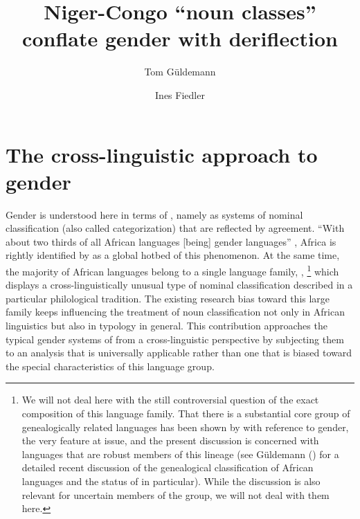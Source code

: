 \documentclass[output=collectionpaper]{langsci/langscibook}
\title{Niger-Congo ``noun classes'' conflate gender with deriflection}
\author{Tom Güldemann%
\affiliation{Humboldt University Berlin and Max Planck Institute for the Science of Human History}%
\and%
Ines Fiedler%
\affiliation{Humboldt University Berlin}
}%
\begin{document}
\section{The cross-linguistic approach to gender}
\label{sec:Gueld:1}

Gender is understood here in terms of \citet{Corbett1991}, namely as systems of nominal classification (also called categorization) that are reflected by agreement. ``With about two thirds of all African languages [being] gender languages'' \citep[190]{Heine1982}, Africa is rightly identified by \citet[131]{Nichols1992} as a global hotbed of this phenomenon. At the same time, the majority of African languages belong to a single language family, ,%
\footnote{We will not deal here with the still controversial question of the exact composition of this language family. That there is a substantial core group of genealogically related languages has been shown by \citet{Westermann1935} with reference to gender, the very feature at issue, and the present discussion is concerned with languages that are robust members of this lineage (see Güldemann (\citeyear{Gueldemann2018}) for a detailed recent discussion of the genealogical classification of African languages and the status of  in particular). While the discussion is also relevant for uncertain members of the group, we will not deal with them here.%
} %
which displays a cross-linguistically unusual type of nominal classification described in a particular philological tradition. The existing research bias toward this large family keeps influencing the treatment of noun classification not only in African linguistics but also in typology in general. This contribution approaches the typical gender systems of  from a cross-linguistic perspective by subjecting them to an analysis that is universally applicable rather than one that is biased toward the special characteristics of this language group.
\end{document}
